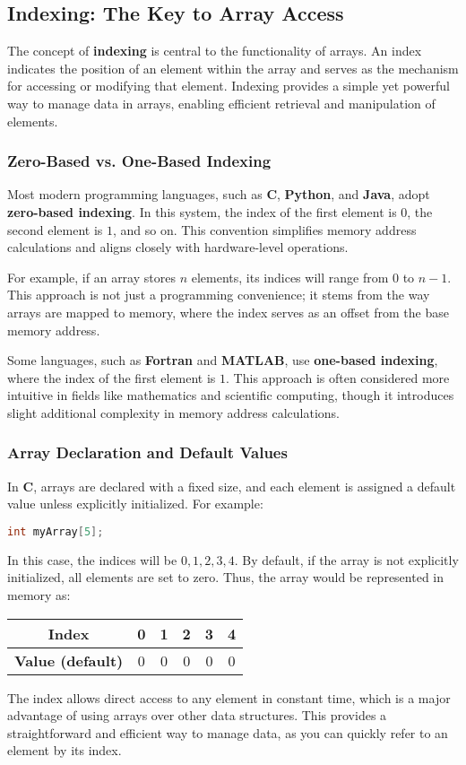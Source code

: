 \documentclass[12pt, oneside]{book}
\begin{document}
\subsection{Indexing: The Key to Array Access}
The concept of \textbf{indexing} is central to the functionality of arrays. An index indicates the position of an element within the array and serves as the mechanism for accessing or modifying that element. Indexing provides a simple yet powerful way to manage data in arrays, enabling efficient retrieval and manipulation of elements.

\subsubsection{Zero-Based vs. One-Based Indexing}
Most modern programming languages, such as \textbf{C}, \textbf{Python}, and \textbf{Java}, adopt \textbf{zero-based indexing}. In this system, the index of the first element is \(0\), the second element is \(1\), and so on. This convention simplifies memory address calculations and aligns closely with hardware-level operations.

For example, if an array stores \(n\) elements, its indices will range from \(0\) to \(n-1\). This approach is not just a programming convenience; it stems from the way arrays are mapped to memory, where the index serves as an offset from the base memory address.

Some languages, such as \textbf{Fortran} and \textbf{MATLAB}, use \textbf{one-based indexing}, where the index of the first element is \(1\). This approach is often considered more intuitive in fields like mathematics and scientific computing, though it introduces slight additional complexity in memory address calculations.

\subsubsection{Array Declaration and Default Values}
In \textbf{C}, arrays are declared with a fixed size, and each element is assigned a default value unless explicitly initialized. For example:

\begin{lstlisting}[language=C]
	int myArray[5];
\end{lstlisting}

In this case, the indices will be \(0, 1, 2, 3, 4\). By default, if the array is not explicitly initialized, all elements are set to zero. Thus, the array would be represented in memory as:
\begin{table}[ht]
	\centering
	\begin{tabular}{|c|c|c|c|c|c}
		\hline
		\textbf{Index} & 0 & 1 & 2 & 3 & 4 \\ 
		\hline
		\textbf{Value (default)} & 0 & 0 & 0 & 0&0 \\ 
		\hline
	\end{tabular}
\end{table}
The index allows direct access to any element in constant time, which is a major advantage of using arrays over other data structures. This provides a straightforward and efficient way to manage data, as you can quickly refer to an element by its index.
\end{document}
